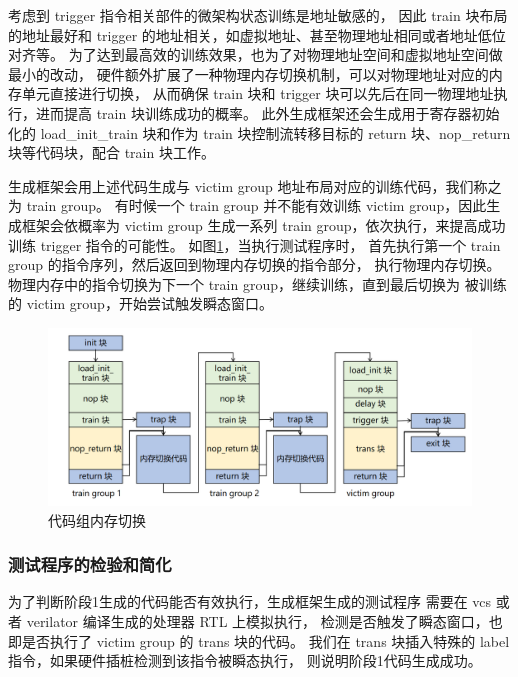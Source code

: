 考虑到 trigger 指令相关部件的微架构状态训练是地址敏感的，
因此 train 块布局的地址最好和 trigger 的地址相关，如虚拟地址、甚至物理地址相同或者地址低位对齐等。
为了达到最高效的训练效果，也为了对物理地址空间和虚拟地址空间做最小的改动，
硬件额外扩展了一种物理内存切换机制，可以对物理地址对应的内存单元直接进行切换，
从而确保 train 块和 trigger 块可以先后在同一物理地址执行，进而提高 train 块训练成功的概率。
此外生成框架还会生成用于寄存器初始化的 load\_init\_train 块和作为 train 块控制流转移目标的
return 块、nop\_return 块等代码块，配合 train 块工作。\par

生成框架会用上述代码生成与 victim group 地址布局对应的训练代码，我们称之为 train group。
有时候一个 train group 并不能有效训练 victim group，因此生成框架会依概率为 victim group
生成一系列 train group，依次执行，来提高成功训练 trigger 指令的可能性。
如图\ref{paper:memory-switch}，当执行测试程序时，
首先执行第一个 train group 的指令序列，然后返回到物理内存切换的指令部分，
执行物理内存切换。物理内存中的指令切换为下一个 train group，继续训练，直到最后切换为
被训练的 victim group，开始尝试触发瞬态窗口。\par

\begin{figure}[!h]
    \centering
    \includegraphics[width=\linewidth]{figure/paper/group-switch.png}
    \caption{代码组内存切换}
    \label{paper:memory-switch}
\end{figure}

\subsubsection{测试程序的检验和简化}

为了判断阶段1生成的代码能否有效执行，生成框架生成的测试程序
需要在 vcs 或者 verilator 编译生成的处理器 RTL 上模拟执行，
检测是否触发了瞬态窗口，也即是否执行了 victim group 的 trans 块的代码。
我们在 trans 块插入特殊的 label 指令，如果硬件插桩检测到该指令被瞬态执行，
则说明阶段1代码生成成功。\par

